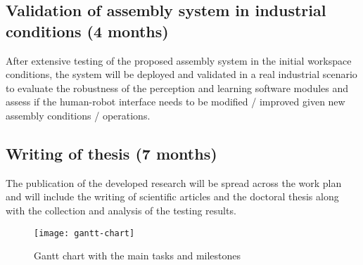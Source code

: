 \subsection{Validation of assembly system in industrial conditions (4 months)}

After extensive testing of the proposed assembly system in the initial workspace conditions, the system will be deployed and validated in a real industrial scenario to evaluate the robustness of the perception and learning software modules and assess if the human-robot interface needs to be modified / improved given new assembly conditions / operations.


\subsection{Writing of thesis (7 months)}

The publication of the developed research will be spread across the work plan and will include the writing of scientific articles and the doctoral thesis along with the collection and analysis of the testing results.



\begin{figure}[H]
	\centering
	\texttt{[image: gantt-chart]}
	\caption{Gantt chart with the main tasks and milestones}
	\label{fig:gantt-chart}
\end{figure}

